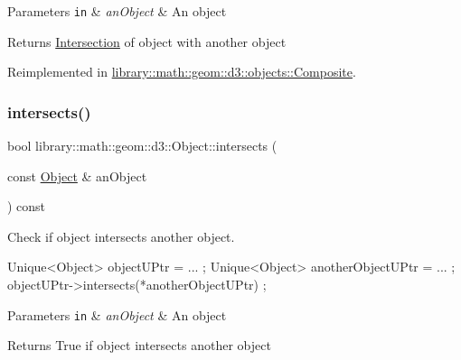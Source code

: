 \begin{DoxyParams}[1]{Parameters}
\mbox{\tt in}  & {\em an\+Object} & An object \\
\hline
\end{DoxyParams}
\begin{DoxyReturn}{Returns}
\hyperlink{classlibrary_1_1math_1_1geom_1_1d3_1_1_intersection}{Intersection} of object with another object 
\end{DoxyReturn}


Reimplemented in \hyperlink{classlibrary_1_1math_1_1geom_1_1d3_1_1objects_1_1_composite_a5af4610cb68cb31bc5be14c06829c116}{library\+::math\+::geom\+::d3\+::objects\+::\+Composite}.

\mbox{\label{classlibrary_1_1math_1_1geom_1_1d3_1_1_object_a98c37b46f2fdc5f22bc123a757dcf73e}} 
\subsubsection{\texorpdfstring{intersects()}{intersects()}}
{\footnotesize\ttfamily bool library\+::math\+::geom\+::d3\+::\+Object\+::intersects (\begin{DoxyParamCaption}\item[{const \hyperlink{classlibrary_1_1math_1_1geom_1_1d3_1_1_object}{Object} \&}]{an\+Object }\end{DoxyParamCaption}) const\hspace{0.3cm}{\ttfamily [virtual]}}



Check if object intersects another object. 


\begin{DoxyCode}
Unique<Object> objectUPtr = ... ;
Unique<Object> anotherObjectUPtr = ... ;
objectUPtr->intersects(*anotherObjectUPtr) ;
\end{DoxyCode}



\begin{DoxyParams}[1]{Parameters}
\mbox{\tt in}  & {\em an\+Object} & An object \\
\hline
\end{DoxyParams}
\begin{DoxyReturn}{Returns}
True if object intersects another object 
\end{DoxyReturn}


